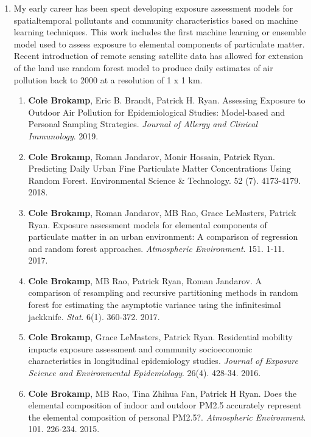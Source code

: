 \documentclass{nihbiosketch}
\begin{document}
\begin{enumerate}

\item My early career has been spent developing exposure assessment models for
  spatialtemporal pollutants and community characteristics based on machine learning
  techniques.  This work includes the first machine
  learning or ensemble model used to assess exposure to elemental components of
  particulate matter. Recent introduction of remote sensing satellite data has
  allowed for extension of the land use random forest model to produce daily
  estimates of air pollution back to 2000 at a resolution of 1 x 1 km.

\begin{enumerate}
	
  \item \textbf{Cole Brokamp}, Eric B. Brandt, Patrick H. Ryan. Assessing
  Exposure to Outdoor Air Pollution for Epidemiological Studies:
  Model-based and Personal Sampling Strategies. \emph{Journal of Allergy
    and Clinical Immunology}. 2019.

	\item \textbf{Cole Brokamp}, Roman Jandarov, Monir Hossain, Patrick Ryan. Predicting Daily Urban Fine Particulate Matter Concentrations Using Random Forest. Environmental Science \& Technology. 52 (7). 4173-4179. 2018.

	\item \textbf{Cole Brokamp}, Roman Jandarov, MB Rao, Grace LeMasters, Patrick Ryan. Exposure assessment models for elemental components of particulate matter in an urban environment: A comparison of regression and random forest approaches. \textit{Atmospheric Environment}. 151. 1-11. 2017.
	
	\item \textbf{Cole Brokamp}, MB Rao, Patrick Ryan, Roman Jandarov. A comparison of resampling and recursive partitioning methods in random forest for estimating the asymptotic variance using the infinitesimal jackknife. \textit{Stat}. 6(1). 360-372. 2017.

  \item \textbf{Cole Brokamp}, Grace LeMasters, Patrick Ryan. Residential
    mobility impacts exposure assessment and community socioeconomic
    characteristics in longitudinal epidemiology studies. \emph{Journal of
      Exposure Science and Environmental Epidemiology}. 26(4). 428-34. 2016.

  \item \textbf{Cole Brokamp}, MB Rao, Tina Zhihua Fan, Patrick H Ryan. Does the
    elemental composition of indoor and outdoor PM2.5 accurately represent
    the elemental composition of personal PM2.5?. \emph{Atmospheric
      Environment}. 101. 226-234. 2015.


\end{enumerate}
\end{enumerate}
\end{document}
